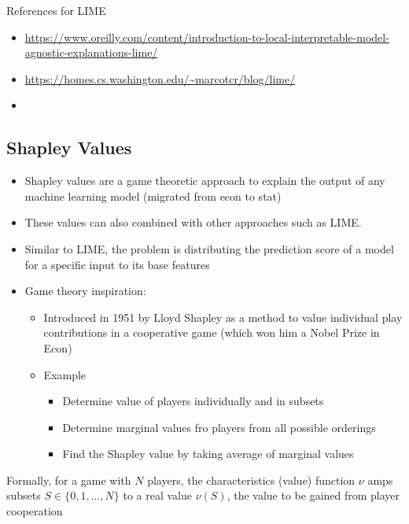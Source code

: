\documentclass[
]{book}
\begin{document}
\hfill\break
References for LIME

\begin{itemize}
\item
  \url{https://www.oreilly.com/content/introduction-to-local-interpretable-model-agnostic-explanations-lime/}
\item
  \url{https://homes.cs.washington.edu/~marcotcr/blog/lime/}
\item
  \citet{ribeiro2016}
\end{itemize}

\hypertarget{shapley-values}{%
\subsection{Shapley Values}\label{shapley-values}}

\begin{itemize}
\item
  Shapley values are a game theoretic approach to explain the output of any machine learning model (migrated from econ to stat)
\item
  These values can also combined with other approaches such as LIME.
\item
  Similar to LIME, the problem is distributing the prediction score of a model for a specific input to its base features
\item
  Game theory inspiration:

  \begin{itemize}
  \item
    Introduced in 1951 by Lloyd Shapley as a method to value individual play contributions in a cooperative game (which won him a Nobel Prize in Econ)
  \item
    Example

    \begin{itemize}
    \item
      Determine value of players individually and in subsets
    \item
      Determine marginal values fro players from all possible orderings
    \item
      Find the Shapley value by taking average of marginal values
    \end{itemize}
  \end{itemize}
\end{itemize}

Formally, for a game with \(N\) players, the characteristics (value) function \(\nu\) amps subsets \(S \in \{0, 1,\dots, N\}\) to a real value \(\nu(S)\), the value to be gained from player cooperation
\end{document}
